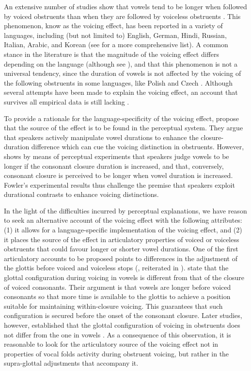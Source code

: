 \documentclass[authoryear, 5p]{elsarticle}
\begin{document}
An extensive number of studies show that vowels tend to be longer when
followed by voiced obstruents than when they are followed by voiceless
obstruents
\citep{house1953, peterson1960, chen1970, klatt1973, lisker1974, farnetani1986, fowler1992, hussein1994, esposito2002, lampp2004, durvasula2012}.
This phenomenon, know as the voicing effect, has been reported in a
variety of languages, including (but not limited to) English, German,
Hindi, Russian, Italian, Arabic, and Korean (see \citealt{maddieson1976}
for a more comprehensive list). A common stance in the literature is
that the magnitude of the voicing effect differs depending on the
language (although see \citealt{laeufer1992}), and that this phenomenon
is not a universal tendency, since the duration of vowels is not
affected by the voicing of the following obstruents in some languages,
like Polish and Czech \citep{keating1984}. Although several attempts
have been made to explain the voicing effect, an account that survives
all empirical data is still lacking \citep{durvasula2012}.

To provide a rationale for the language-specificity of the voicing
effect, \citet{kluender1988} propose that the source of the effect is to
be found in the perceptual system. They argue that speakers actively
manipulate vowel durations to enhance the closure-duration difference
which can cue the voicing distinction in obstruents. However,
\citet{fowler1992} shows by means of perceptual experiments that
speakers judge vowels to be longer if the consonant closure duration is
increased, and that, conversely, consonant closure is perceived to be
longer when vowel duration is increased. Fowler's experimental results
thus challenge the premise that speakers exploit durational contrasts to
enhance voicing distinctions.

In the light of the difficulties incurred by perceptual explanations, we
have reason to seek an alternative account of the voicing effect with
the following attributes: (1) it allows for a language-specific
implementation of the voicing effect, and (2) it places the source of
the effect in articulatory properties of voiced or voiceless obstruents
that could favour longer or shorter vowel durations. One of the first
articulatory accounts to be proposed points to differences in the
adjustment of the glottis before voiced and voiceless stops
(\citealt{halle1967}, reiterated in \citealt{chomsky1968}).
\citet{halle1967} state that the glottal configuration during voicing in
vowels is different from that of the closure of voiced consonants. Their
argument is that vowels are longer before voiced consonants so that more
time is available to the glottis to achieve a position suitable for
maintaining within-closure voicing. This guarantees that such
configuration is secured before the onset of the consonant closure.
Later studies, however, established that the glottal configuration of
voicing in obstruents does not differ from the one in vowels
\citep{lisker1974,kagaya1975}. As a consequence of this observation, it
is reasonable to look for the articulatory source of the voicing effect
not in properties of vocal folds activity during obstruent voicing, but
rather in the supra-glottal adjustments that accompany it.
\end{document}
